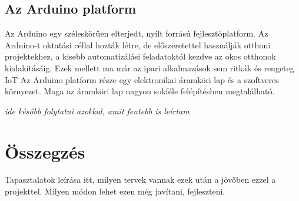 \documentclass[
]{thesis-ekf}
\theoremstyle{definition}
\theoremstyle{remark}
\begin{document}
\section*{Az Arduino platform}
Az Arduino egy széleskörűen elterjedt, nyílt forrású fejlesztőplatform. Az Arduino-t oktatási céllal hozták létre, de előszeretettel használják otthoni projektekhez, a kisebb automatizálási feladatoktól kezdve az okos otthonok kialakításáig. Ezek mellett ma már az ipari alkalmazások sem ritkák és rengeteg IoT
Az Arduino platform része egy elektronikai áramköri lap és a szoftveres környezet. Maga az áramköri lap nagyon sokféle felépítésben megtalálható.

\emph{ide később folytatni azokkal, amit fentebb is leírtam}







\chapter*{Összegzés}
Tapasztalatok leírása itt, milyen tervek vannak ezek után a jövőben ezzel a projekttel. Milyen módon lehet ezen még javítani, fejleszteni.
\end{document}
